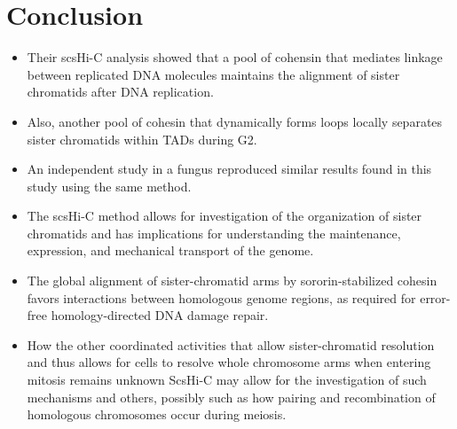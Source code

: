 \documentclass[plain,basic]{inVerba-notes}
\begin{document}
\section{Conclusion}
\begin{itemize}
    \item Their scsHi-C analysis showed that a pool of cohensin that mediates linkage between replicated DNA molecules maintains the alignment of sister chromatids after DNA replication.
    \item Also, another pool of cohesin that dynamically forms loops locally separates sister chromatids within TADs during G2.
    \item An independent study in a fungus reproduced similar results found in this study using the same method.
    \item The scsHi-C method allows for investigation of the organization of sister chromatids and has implications for understanding the maintenance, expression, and mechanical transport of the genome.
    \item The global alignment of sister-chromatid arms by sororin-stabilized cohesin favors interactions between homologous genome regions, as required for error-free homology-directed DNA damage repair.
    \item How the other coordinated activities that allow sister-chromatid resolution and thus allows for cells to resolve whole chromosome arms when entering mitosis remains unknown ScsHi-C may allow for the investigation of such mechanisms and others, possibly such as how pairing and recombination of homologous chromosomes occur during meiosis. 
\end{itemize}

\nocite{mitter2020conformation}


\end{document}
